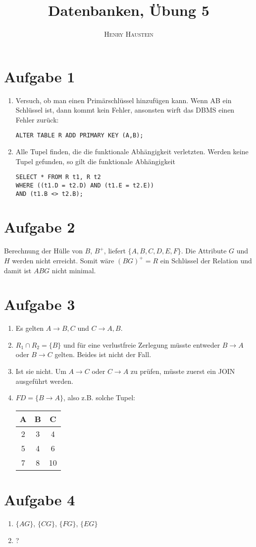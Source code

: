 \documentclass{article}
\title{\textbf{Datenbanken, Übung 5}}
\author{\textsc{Henry Haustein}}
\date{}
\begin{document}
	\maketitle
	
	\section*{Aufgabe 1}
	\begin{enumerate}[label=(\alph*)]
		\item Versuch, ob man einen Primärschlüssel hinzufügen kann. Wenn AB ein Schlüssel ist, dann kommt kein Fehler, ansonsten wirft das DBMS einen Fehler zurück:
		\begin{lstlisting}[style=sql]
ALTER TABLE R ADD PRIMARY KEY (A,B);
		\end{lstlisting}
		\item Alle Tupel finden, die die funktionale Abhängigkeit verletzten. Werden keine Tupel gefunden, so gilt die funktionale Abhängigkeit
		\begin{lstlisting}[style=sql]
SELECT * FROM R t1, R t2 
WHERE ((t1.D = t2.D) AND (t1.E = t2.E)) 
AND (t1.B <> t2.B);
		\end{lstlisting}
	\end{enumerate}

	\section*{Aufgabe 2}
	Berechnung der Hülle von $B$, $B^+$, liefert $\{A,B,C,D,E,F\}$. Die Attribute $G$ und $H$ werden nicht erreicht. Somit wäre $(BG)^+ = R$ ein Schlüssel der Relation und damit ist $ABG$ nicht minimal.

	\section*{Aufgabe 3}
	\begin{enumerate}[label=(\alph*)]
		\item Es gelten $A\to B,C$ und $C\to A,B$.
		\item $R_1\cap R_2 = \{B\}$ und für eine verlustfreie Zerlegung müsste entweder $B\to A$ oder $B\to C$ gelten. Beides ist nicht der Fall.
		\item Ist sie nicht. Um $A\to C$ oder $C\to A$ zu prüfen, müsste zuerst ein JOIN ausgeführt werden.
		\item $FD = \{B\to A\}$, also z.B. solche Tupel:
		\begin{center}
			\begin{tabular}{c|c|c}
				\textbf{A} & \textbf{B} & \textbf{C} \\
				\hline
				2 & 3 & 4 \\
				5 & 4 & 6 \\
				7 & 8 & 10
			\end{tabular}
		\end{center}
	\end{enumerate}
	
	\section*{Aufgabe 4}
	\begin{enumerate}[label=(\alph*)]
		\item $\{AG\}$, $\{CG\}$, $\{FG\}$, $\{EG\}$
		\item ?
	\end{enumerate}
	
\end{document}
